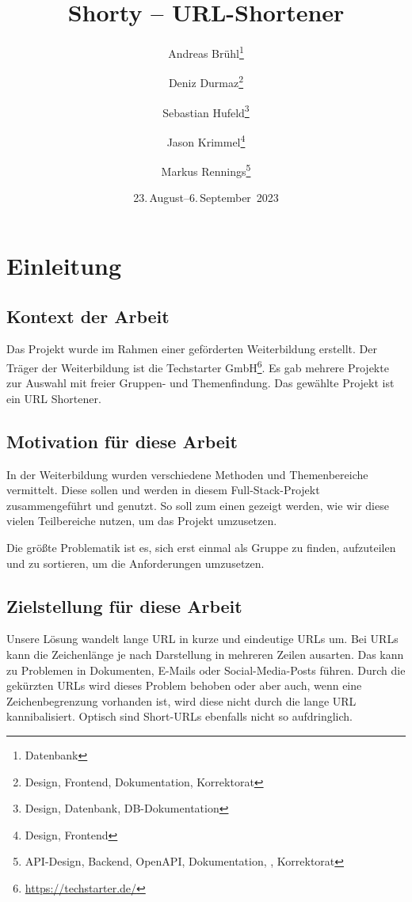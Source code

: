 \documentclass[a4paper,11pt,DIV=12]{scrreprt}%
\title{Shorty – URL-Shortener}
\subtitle{}
\author{Andreas Brühl\thanks{Datenbank} \and Deniz Durmaz\thanks{Design, Frontend, Dokumentation, Korrektorat} \and Sebastian Hufeld\thanks{Design, Datenbank, DB-Dokumentation} \and Jason Krimmel\thanks{Design, Frontend} \and Markus Rennings\thanks{API-Design, Backend, OpenAPI, Dokumentation, \XeLaTeX, Korrektorat}}
\date{23.\,August–6.\,September~2023}
\begin{document}
\maketitle

\tableofcontents

\chapter{Einleitung}
\section{Kontext der Arbeit}
Das Projekt wurde im Rahmen einer geförderten Weiterbildung erstellt. Der Träger der Weiterbildung ist die Techstarter GmbH\footnote{\href{https://techstarter.de/}{https://techstarter.de/}}. Es gab mehrere Projekte zur Auswahl mit freier Gruppen- und Themenfindung. Das gewählte Projekt ist ein URL Shortener.

\section{Motivation für diese Arbeit}
In der Weiterbildung wurden verschiedene Methoden und Themenbereiche vermittelt. Diese sollen und werden in diesem Full-Stack-Projekt zusammengeführt und genutzt. So soll zum einen gezeigt werden, wie wir diese vielen Teilbereiche nutzen, um das Projekt umzusetzen.

Die größte Problematik ist es, sich erst einmal als Gruppe zu finden, aufzuteilen und zu sortieren, um die Anforderungen umzusetzen.

\section{Zielstellung für diese Arbeit}
Unsere Lösung wandelt lange \ac{URL} in kurze und eindeutige \ac{URL}s um. Bei \ac{URL}s kann die Zeichenlänge je nach Darstellung in mehreren Zeilen ausarten. Das kann zu Problemen in Dokumenten, E-Mails oder Social-Media-Posts führen. Durch die gekürzten \ac{URL}s wird dieses Problem behoben oder aber auch, wenn eine Zeichenbegrenzung vorhanden ist, wird diese nicht durch die lange \ac{URL} kannibalisiert. Optisch sind Short-\ac{URL}s ebenfalls nicht so aufdringlich.
\end{document}
